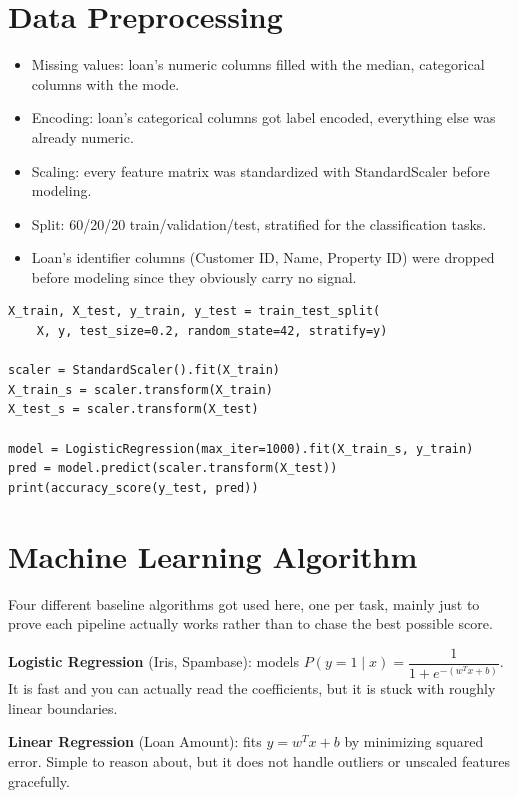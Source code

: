 \documentclass[12pt,a4paper]{article}
\begin{document}
\section{Data Preprocessing}
\begin{itemize}
\item Missing values: loan's numeric columns filled with the median, categorical columns with the mode.
\item Encoding: loan's categorical columns got label encoded, everything else was already numeric.
\item Scaling: every feature matrix was standardized with StandardScaler before modeling.
\item Split: 60/20/20 train/validation/test, stratified for the classification tasks.
\item Loan's identifier columns (Customer ID, Name, Property ID) were dropped before modeling since
they obviously carry no signal.
\end{itemize}

\begin{lstlisting}[caption={Same pattern reused across all five datasets: split, scale, fit, evaluate}]
X_train, X_test, y_train, y_test = train_test_split(
    X, y, test_size=0.2, random_state=42, stratify=y)

scaler = StandardScaler().fit(X_train)
X_train_s = scaler.transform(X_train)
X_test_s = scaler.transform(X_test)

model = LogisticRegression(max_iter=1000).fit(X_train_s, y_train)
pred = model.predict(scaler.transform(X_test))
print(accuracy_score(y_test, pred))
\end{lstlisting}

\section{Machine Learning Algorithm}
Four different baseline algorithms got used here, one per task, mainly just to prove each pipeline
actually works rather than to chase the best possible score.

\textbf{Logistic Regression} (Iris, Spambase): models
$P(y=1\mid x) = \dfrac{1}{1+e^{-(w^Tx+b)}}$. It is fast and you can actually read the coefficients, but
it is stuck with roughly linear boundaries.

\textbf{Linear Regression} (Loan Amount): fits $y = w^Tx + b$ by minimizing squared error. Simple to
reason about, but it does not handle outliers or unscaled features gracefully.
\end{document}
